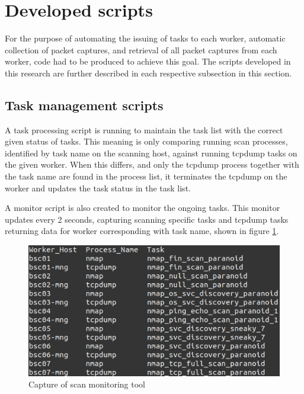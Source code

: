 \section{Developed scripts}
\label{s:Scripts}
For the purpose of automating the issuing of tasks to each worker, automatic collection of packet captures, and retrieval of all packet captures from each worker, code had to be produced to achieve this goal. The scripts developed in this research are further described in each respective subsection in this section.








\subsection{Task management scripts}

A task processing script is running to maintain the task list with the correct given status of tasks.
This meaning is only comparing running scan processes, identified by task name on the scanning host, against running tcpdump tasks on the given worker. When this differs, and only the tcpdump process together with the task name are found in the process list, it terminates the tcpdump on the worker and updates the task status in the task list.

A monitor script is also created to monitor the ongoing tasks. This monitor updates every 2 seconds, capturing scanning specific tasks and tcpdump tasks returning data for worker corresponding with task name, shown in figure \ref{fig:LabScanMonitor}.

\begin{figure}[htbp]
\centerline{\includegraphics[scale=0.7]{images/lab/workermonitor.png}}
\caption{Capture of scan monitoring tool}
\label{fig:LabScanMonitor}
\end{figure}


